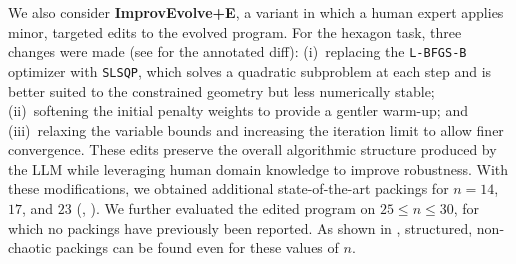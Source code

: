 \documentclass[sigconf]{acmart}
\begin{document}
We also consider \textbf{ImprovEvolve+E}, a variant in which a human expert applies minor, targeted edits to the evolved program. For the hexagon task, three changes were made (see  for the annotated diff): (i)~replacing the \texttt{L-BFGS-B} optimizer with \texttt{SLSQP}, which solves a quadratic subproblem at each step and is better suited to the constrained geometry but less numerically stable; (ii)~softening the initial penalty weights to provide a gentler warm-up; and (iii)~relaxing the variable bounds and increasing the iteration limit to allow finer convergence. These edits preserve the overall algorithmic structure produced by the LLM while leveraging human domain knowledge to improve robustness. With these modifications, we obtained additional state-of-the-art packings for $n = 14$, $17$, and $23$ (, ). We further evaluated the edited program on $25 \leq n \leq 30$, for which no packings have previously been reported. As shown in , structured, non-chaotic packings can be found even for these values of $n$.
\end{document}
